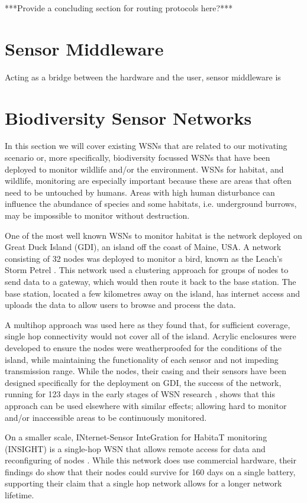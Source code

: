 ***Provide a concluding section for routing protocols here?***

\section{Sensor Middleware} \label{bg:sm}
	Acting as a bridge between the hardware and the user, sensor middleware is 

\section{Biodiversity Sensor Networks} \label{bg:bsn}
	In this section we will cover existing WSNs that are related to our motivating scenario or, more specifically, biodiversity focussed WSNs that have been deployed to monitor wildlife and/or the environment. WSNs for habitat, and wildlife, monitoring are especially important because these are areas that often need to be untouched by humans. Areas with high human disturbance can influence the abundance of species and some habitats, i.e. underground burrows, may be impossible to monitor without destruction.

	One of the most well known WSNs to monitor habitat is the network deployed on Great Duck Island (GDI), an island off the coast of Maine, USA. A network consisting of 32 nodes was deployed to monitor a bird, known as the Leach’s Storm Petrel \cite{Mainwaring2002}. This network used a clustering approach for groups of nodes to send data to a gateway, which would then route it back to the base station. The base station, located a few kilometres away on the island, has internet access and uploads the data to allow users to browse and process the data.

	A multihop approach was used here as they found that, for sufficient coverage, single hop connectivity would not cover all of the island. Acrylic enclosures were developed to ensure the nodes were weatherproofed for the conditions of the island, while maintaining the functionality of each sensor and not impeding transmission range. While the nodes, their casing and their sensors have been designed specifically for the deployment on GDI, the success of the network, running for 123 days in the early stages of WSN research \cite{Szewczyk2004c}, shows that this approach can be used elsewhere with similar effects; allowing hard to monitor and/or inaccessible areas to be continuously monitored.

	On a smaller scale, INternet-Sensor InteGration for HabitaT monitoring (INSIGHT) is a single-hop WSN that allows remote access for data and reconfiguring of nodes \cite{Demirbas}. While this network does use commercial hardware, their findings do show that their nodes could survive for 160 days on a single battery, supporting their claim that a single hop network allows for a longer network lifetime. 
	
